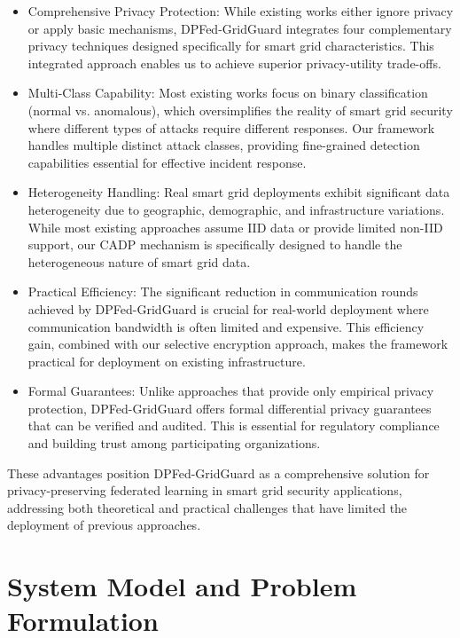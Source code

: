\documentclass{ieeeaccess}
\theoremstyle{definition}
\begin{document}
\begin{itemize}
    \item Comprehensive Privacy Protection: While existing works either ignore privacy or apply basic mechanisms, DPFed-GridGuard integrates four complementary privacy techniques designed specifically for smart grid characteristics. This integrated approach enables us to achieve superior privacy-utility trade-offs.
    \item Multi-Class Capability: Most existing works focus on binary classification (normal vs. anomalous), which oversimplifies the reality of smart grid security where different types of attacks require different responses. Our framework handles multiple distinct attack classes, providing fine-grained detection capabilities essential for effective incident response.
    \item Heterogeneity Handling: Real smart grid deployments exhibit significant data heterogeneity due to geographic, demographic, and infrastructure variations. While most existing approaches assume IID data or provide limited non-IID support, our CADP mechanism is specifically designed to handle the heterogeneous nature of smart grid data.
    \item Practical Efficiency: The significant reduction in communication rounds achieved by DPFed-GridGuard is crucial for real-world deployment where communication bandwidth is often limited and expensive. This efficiency gain, combined with our selective encryption approach, makes the framework practical for deployment on existing infrastructure.
    \item Formal Guarantees: Unlike approaches that provide only empirical privacy protection, DPFed-GridGuard offers formal differential privacy guarantees that can be verified and audited. This is essential for regulatory compliance and building trust among participating organizations.
\end{itemize}

These advantages position DPFed-GridGuard as a comprehensive solution for privacy-preserving federated learning in smart grid security applications, addressing both theoretical and practical challenges that have limited the deployment of previous approaches.

\section{System Model and Problem Formulation}
\label{sec:system_model}
\end{document}
